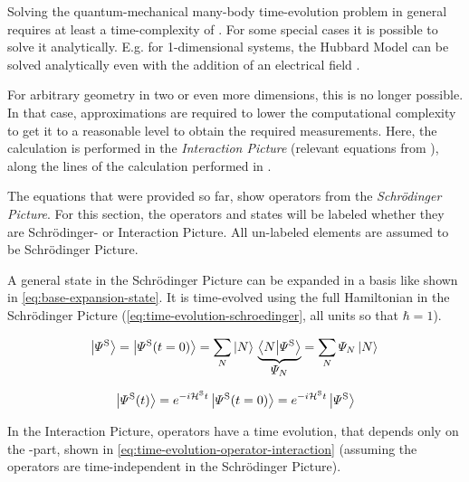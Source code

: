 Solving the quantum-mechanical many-body time-evolution problem in general requires at least a time-complexity of .
For some special cases it is possible to solve it analytically.
E.g. for 1-dimensional systems, the Hubbard Model can be solved analytically even with the addition of an electrical field \cite{exactSolutionExampleHubbardEvenElectricalField}.

For arbitrary geometry in two or even more dimensions, this is no longer possible.
In that case, approximations are required to lower the computational complexity to get it to a reasonable level to obtain the required measurements.
Here, the calculation is performed in the \emph{Interaction Picture} (relevant equations from \cite{schwablBook}), along the lines of the calculation performed in \cite{variationalClassicalNetworksPaper}.

The equations that were provided so far, show operators from the \emph{Schrödinger Picture}. 
For this section, the operators and states will be labeled whether they are Schrödinger- or Interaction Picture. All un-labeled elements are assumed to be Schrödinger Picture.

A general state in the Schrödinger Picture can be expanded in a basis like shown in \autoref{eq:base-expansion-state}. It is time-evolved using the full Hamiltonian in the Schrödinger Picture (\autoref{eq:time-evolution-schroedinger}, all units so that $\hbar = 1$).

\begin{equation}
    \label{eq:base-expansion-state}
    \ketpsi[\schroedingerPicture]{} = \ketpsiof[\schroedingerPicture]{t=0} = 
    \lsum[N] \ketN{}\underbrace{\braketHelper{N}{\picturePsi[\schroedingerPicture]{}}}_{\text{\normalsize\psiN}} = \lsum[N] \psiN \ketN{}
\end{equation}

\begin{equation}
    \label{eq:time-evolution-schroedinger}
    \ketpsiof[\schroedingerPicture]{t} = e^{-i \pictureHamiltonian[\schroedingerPicture] t} \ketpsiof[\schroedingerPicture]{t=0} = e^{-i \pictureHamiltonian[\schroedingerPicture] t} \ketpsi[\schroedingerPicture]{}
\end{equation}

In the Interaction Picture, operators have a time evolution, that depends only on the \HzeroHamiltonian[\schroedingerPicture]{}-part, shown in \autoref{eq:time-evolution-operator-interaction} (assuming the operators are time-independent in the Schrödinger Picture). 

